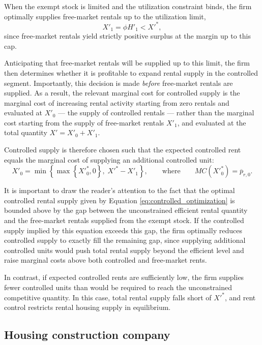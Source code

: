 \documentclass[parskip=full]{article}
\begin{document}
When the exempt stock is limited and the utilization constraint binds, the firm optimally supplies free-market rentals up to the utilization limit,
\begin{equation}\label{eq:uncontrolled_optimization}
X'_1 = \phi H'_1 < X'^*,
\end{equation}
since free-market rentals yield strictly positive surplus at the margin up to this cap.

Anticipating that free-market rentals will be supplied up to this limit, the firm then determines whether it is profitable to expand rental supply in the controlled segment. Importantly, this decision is made \emph{before} free-market rentals are supplied. As a result, the relevant marginal cost for controlled supply is the marginal cost of increasing rental activity starting from zero rentals and evaluated at $X'_0$ — the supply of controlled rentals — rather than the marginal cost starting from the supply of free-market rentals $X'_1$, and evaluated at the total quantity $X'=X'_0 + X'_1$.

Controlled supply is therefore chosen such that the expected controlled rent equals the marginal cost of supplying an additional controlled unit:
\begin{equation}\label{eq:controlled_optimization}
X'_0=\min\left\{\max\left\{X'^*_0, 0\right\},\; X'^* - X'_1
\right\},\qquad \text{where} \qquad MC(X'^*_0) = \overline{p}_{r,0}.
\end{equation}

\noindent It is important to draw the reader's attention to the fact that the optimal controlled rental supply given by Equation \eqref{eq:controlled_optimization} is bounded above by the gap between the unconstrained efficient rental quantity and the free-market rentals supplied from the exempt stock. If the controlled supply implied by this equation exceeds this gap, the firm optimally reduces controlled supply to exactly fill the remaining gap, since supplying additional controlled units would push total rental supply beyond the efficient level and raise marginal costs above both controlled and free-market rents. 

In contrast, if expected controlled rents are sufficiently low, the firm supplies fewer controlled units than would be required to reach the unconstrained competitive quantity. In this case, total rental supply falls short of $X'^*$, and rent control restricts rental housing supply in equilibrium.

\subsection{Housing construction company}\label{sec:construction_company}
\end{document}
